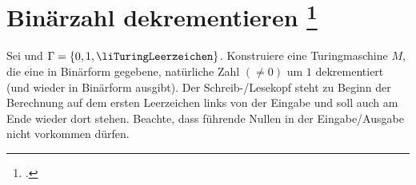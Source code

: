 \documentclass{lehramt-informatik-aufgabe}
\begin{document}
\let\t=\liTuringUebergangZelle

\section{Binärzahl dekrementieren
\footcite[Aufgabe 3]{theo:ab:3}}

Sei  und $\Gamma = \{ 0, 1, \liTuringLeerzeichen \}$.
Konstruiere eine Turingmaschine $M$, die eine in Binärform gegebene,
natürliche Zahl $(\neq 0)$ um $1$ dekrementiert (und wieder in Binärform
ausgibt). Der Schreib-/Lesekopf steht zu Beginn der Berechnung auf dem
ersten Leerzeichen links von der Eingabe und soll auch am Ende wieder
dort stehen. Beachte, dass führende Nullen in der Eingabe/Ausgabe nicht
vorkommen dürfen.
\end{document}
